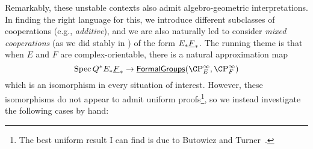 Remarkably, these unstable contexts also admit algebro-geometric interpretations.  In finding the right language for this, we introduce different subclasses of cooperations (e.g., \textit{additive}), and we are also naturally led to consider \textit{mixed cooperations} (as we did stably in ) of the form $E_* \underline{\smash{F}}_{*}$.  The running theme is that when $E$ and $F$ are complex-orientable, there is a natural approximation map \[\Spec Q^* E_* \OS{F}{*} \to \InternalHom{FormalGroups}(\CP^\infty_E, \CP^\infty_F)\] which is an isomorphism in every situation of interest.  However, these isomorphisms do not appear to admit uniform proofs\footnote{The best uniform result I can find is due to Butowiez and Turner~\cite[Theorem 3.12]{ButowiezTurner}.}, so we instead investigate the following cases by hand:
